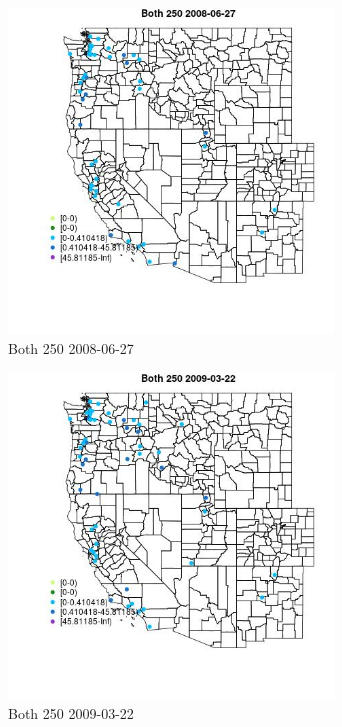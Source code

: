 \begin{figure} 
\centering  
\includegraphics[width=0.77\textwidth]{Code_Outputs/Report_ML_input_PM25_Step4_part_e_de_duplicated_aves_MapObsBoth_2502008-06-27.jpg} 
\caption{\label{fig:Report_ML_input_PM25_Step4_part_e_de_duplicated_avesMapObsBoth_2502008-06-27}Both 250 2008-06-27} 
\end{figure} 
 

\clearpage 

\begin{figure} 
\centering  
\includegraphics[width=0.77\textwidth]{Code_Outputs/Report_ML_input_PM25_Step4_part_e_de_duplicated_aves_MapObsBoth_2502009-03-22.jpg} 
\caption{\label{fig:Report_ML_input_PM25_Step4_part_e_de_duplicated_avesMapObsBoth_2502009-03-22}Both 250 2009-03-22} 
\end{figure} 
 

